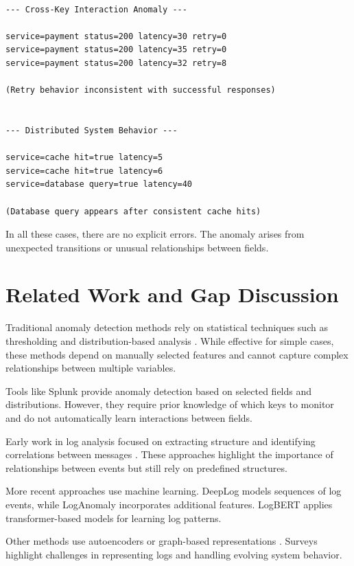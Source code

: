 \documentclass[12pt]{article}
\begin{document}
\begin{lstlisting}[caption={State Transition Anomalies in Key-Value Logs}]

--- Cross-Key Interaction Anomaly ---

service=payment status=200 latency=30 retry=0
service=payment status=200 latency=35 retry=0
service=payment status=200 latency=32 retry=8

(Retry behavior inconsistent with successful responses)


--- Distributed System Behavior ---

service=cache hit=true latency=5
service=cache hit=true latency=6
service=database query=true latency=40

(Database query appears after consistent cache hits)

\end{lstlisting}

In all these cases, there are no explicit errors. The anomaly arises from unexpected transitions or unusual relationships between fields.

\section{Related Work and Gap Discussion}

Traditional anomaly detection methods rely on statistical techniques such as thresholding and distribution-based analysis \cite{chandola2009survey}. While effective for simple cases, these methods depend on manually selected features and cannot capture complex relationships between multiple variables.

Tools like Splunk provide anomaly detection based on selected fields and distributions. However, they require prior knowledge of which keys to monitor and do not automatically learn interactions between fields.

Early work in log analysis focused on extracting structure and identifying correlations between messages \cite{xu2009consolelogs, lou2010invariants}. These approaches highlight the importance of relationships between events but still rely on predefined structures.

More recent approaches use machine learning. DeepLog \cite{du2017deeplog} models sequences of log events, while LogAnomaly \cite{meng2019loganomaly} incorporates additional features. LogBERT \cite{guo2021logbert} applies transformer-based models for learning log patterns.

Other methods use autoencoders \cite{catillo2022autolog} or graph-based representations \cite{li2024logs2graphs}. Surveys \cite{landauer2023dlsurvey} highlight challenges in representing logs and handling evolving system behavior.
\end{document}
